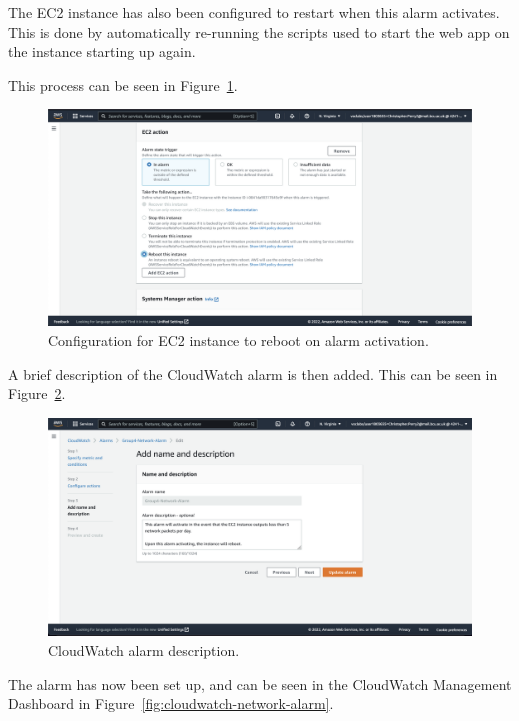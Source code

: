 The EC2 instance has also been configured to restart when this alarm activates.
This is done by automatically re-running the scripts used to start the web app on the instance starting up again.

This process can be seen in Figure~\ref{fig:cloudwatch-ec2-actions}.

\begin{figure}[!htbp]
    \centering
    \includegraphics[width=\textwidth]{resources/cloudwatch/cloudwatch-ec2-actions}
    \caption{Configuration for EC2 instance to reboot on alarm activation.}
    \label{fig:cloudwatch-ec2-actions}
\end{figure}

A brief description of the CloudWatch alarm is then added.
This can be seen in Figure~\ref{fig:cloudwatch-description}.

\begin{figure}[!htbp]
    \centering
    \includegraphics[width=\textwidth]{resources/cloudwatch/cloudwatch-description}
    \caption{CloudWatch alarm description.}
    \label{fig:cloudwatch-description}
\end{figure}

The alarm has now been set up, and can be seen in the CloudWatch Management Dashboard in Figure~\ref{fig:cloudwatch-network-alarm}.

